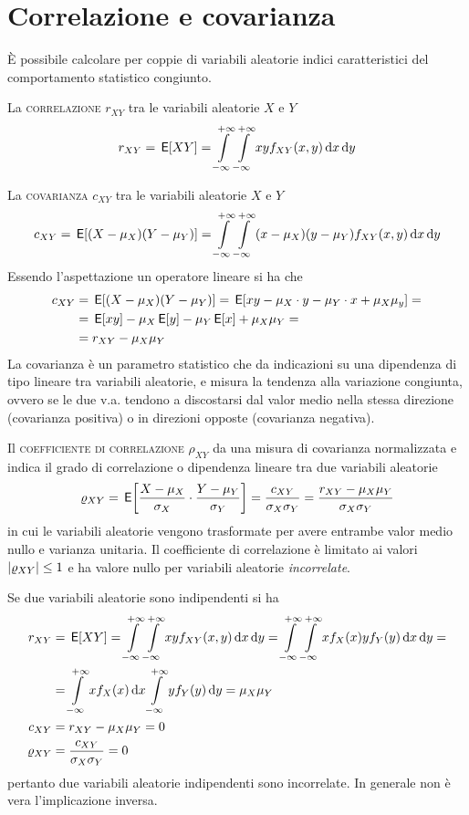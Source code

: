 \section{Correlazione e covarianza}
\`{E} possibile calcolare per coppie di variabili aleatorie indici caratteristici del comportamento statistico congiunto.

La \textsc{correlazione} $r_{XY}$ tra le variabili aleatorie $X$ e $Y$
\begin{equation}
\label{eq:v_a_correlazione}
	r_{XY}=\,{\operatorname{\mathsf{E}}}\!\left[{X Y}\right]=\int\limits_{-\infty}^{+\infty}{\int\limits_{-\infty}^{+\infty}{x y f_{XY}(x,y)}{\,\mathop{}\!\mathrm{d}{x}}}{\,\mathop{}\!\mathrm{d}{y}}
\end{equation}

La \textsc{covarianza} $c_{XY}$ tra le variabili aleatorie $X$ e $Y$
\begin{equation}
\label{eq:v_a_covarianza}
	c_{XY}=\,{\operatorname{\mathsf{E}}}\!\left[{(X-\mu_X)(Y-\mu_Y)}\right]=\int\limits_{-\infty}^{+\infty}{\int\limits_{-\infty}^{+\infty}{(x-\mu_X)(y-\mu_Y)f_{XY}(x,y)}{\,\mathop{}\!\mathrm{d}{x}}}{\,\mathop{}\!\mathrm{d}{y}}
\end{equation}
Essendo l'aspettazione un operatore lineare si ha che
\begin{equation}
\begin{split}
	c_{XY}&=\,{\operatorname{\mathsf{E}}}\!\left[{(X-\mu_X)(Y-\mu_Y)}\right]=\,{\operatorname{\mathsf{E}}}\!\left[{x y-\mu_X\cdot y-\mu_Y\cdot x+\mu_X\mu_y}\right]=\\
	&=\,{\operatorname{\mathsf{E}}}\!\left[{x y}\right]-\mu_X \,{\operatorname{\mathsf{E}}}\!\left[{y}\right]-\mu_Y \,{\operatorname{\mathsf{E}}}\!\left[{x}\right]+\mu_X\mu_Y=\\
	&=r_{XY}-\mu_X\mu_Y
\end{split}
\end{equation}
La covarianza è un parametro statistico che da indicazioni su una dipendenza di tipo lineare tra variabili aleatorie, e misura la tendenza alla variazione congiunta, ovvero se le due v.a. tendono a discostarsi dal valor medio nella stessa direzione (covarianza positiva) o in direzioni opposte (covarianza negativa).

Il \textsc{coefficiente di correlazione} $\rho_{XY}$ da una misura di covarianza normalizzata e indica il grado di correlazione o dipendenza lineare tra due variabili aleatorie
\begin{equation}
	\varrho_{XY}=\,{\operatorname{\mathsf{E}}}\!\left[{\frac{X-\mu_X}{\sigma_X}\cdot\frac{Y-\mu_Y}{\sigma_Y}}\right]=\frac{c_{XY}}{\sigma_X\sigma_Y}=\frac{r_{XY}-\mu_X\mu_Y}{\sigma_X\sigma_Y}
\end{equation}
in cui le variabili aleatorie vengono trasformate per avere entrambe valor medio nullo e varianza unitaria. Il coefficiente di correlazione è limitato ai valori $\left|{\varrho_{XY}}\right|\leq 1$ e ha valore nullo per variabili aleatorie \emph{incorrelate}.

Se due variabili aleatorie sono indipendenti si ha
\[
	\begin{split}
		r_{XY}&=\,{\operatorname{\mathsf{E}}}\!\left[{X Y}\right]=\int\limits_{-\infty}^{+\infty}{\int\limits_{-\infty}^{+\infty}{x y f_{XY}(x,y)}{\,\mathop{}\!\mathrm{d}{x}}}{\,\mathop{}\!\mathrm{d}{y}}=\int\limits_{-\infty}^{+\infty}{\int\limits_{-\infty}^{+\infty}{x f_{X}(x) y f_{Y}(y)}{\,\mathop{}\!\mathrm{d}{x}}}{\,\mathop{}\!\mathrm{d}{y}}=\\
		&=\int\limits_{-\infty}^{+\infty}{x f_{X}(x)}{\,\mathop{}\!\mathrm{d}{x}}\int\limits_{-\infty}^{+\infty}{y f_{Y}(y)}{\,\mathop{}\!\mathrm{d}{y}}=\mu_X\mu_Y\\
		c_{XY}&=r_{XY}-\mu_X\mu_Y=0\\
		\varrho_{XY}&=\frac{c_{XY}}{\sigma_X\sigma_Y}=0
	\end{split}
\]
pertanto due variabili aleatorie indipendenti sono incorrelate. In generale non è vera l'implicazione inversa.

